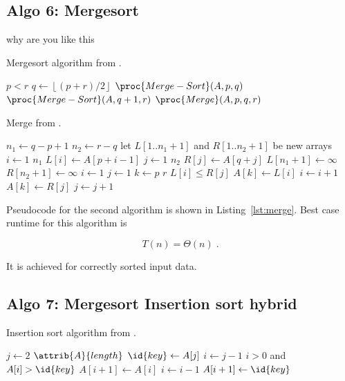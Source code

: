 \subsection{Algo 6: Mergesort}\label{sec:algo6}
why are you like this

\begin{algorithm}[H]
  \caption{Mergesort algorithm from \cite[Ch.~2.1]{cormen_introduction_2009}.}
  \label{lst:mergesort_algo}
  \begin{codebox}
	\li \If $p < r$
	\li \Then $q \gets \left\lfloor(p + r) / 2\right\rfloor$
	\li 	$\proc{Merge-Sort}(A, p, q)$
	\li 	$\proc{Merge-Sort}(A, q+1, r)$
	\li 	$\proc{Merge}(A, p, q, r)$
	\End
  \end{codebox}
\end{algorithm}

\begin{algorithm}[H]
  \caption{Merge from \cite[Ch.~2.1]{cormen_introduction_2009}.}
  \label{lst:merge}
  \begin{codebox}
	\li $n_1 \gets q-p+1$
	\li $n_2 \gets r-q$
	\li let $L[1..n_1+1]$ and $R[1..n_2+1]$ be new arrays
	\li \For $i \gets 1$ \To $n_1$
	\li \Do $L[i] \gets A[p+i-1]$
	\End
	\li \For $j \gets 1$ \To $n_2$
	\li \Do $R[j] \gets A[q+j]$
	\End
	\li $L[n_1+1] \gets \infty$
	\li $R[n_2+1] \gets \infty$
	\li $i \gets 1$
	\li $j \gets 1$
	\li \For $k \gets p$ \To $r$
	\li \Do \If $L[i] \le R[j]$
	\li 	\Then $A[k] \gets L[i]$
	\li 		$i \gets i+1$
	\li 	\Else $A[k] \gets R[j]$
	\li 	$j \gets j+1$
	\End
	\End
  \end{codebox}
\end{algorithm}

Pseudocode for the second algorithm is shown in
Listing~\ref{lst:merge}. Best case runtime for this algorithm
is

\begin{equation}
  T(n) = \Theta(n) \;.  \label{eq:ins_sort_best}
\end{equation}

It is achieved for correctly sorted input data.

\subsection{Algo 7: Mergesort Insertion sort hybrid}\label{sec:algo7}

\begin{algorithm}[H]
  \caption{Insertion sort algorithm from \cite[Ch.~2.1]{cormen_introduction_2009}.}
  \label{lst:mergeinsert_algo}
  \begin{codebox}
    \li \For $j \gets 2$ \To $\attrib{A}{length}$
    \li \Do
    $\id{key} \gets A[j]$
    \li     $i \gets j-1$
    \li      \While $i>0$ and $A[i] > \id{key}$
    \li      \Do
    $A[i+1] \gets A[i]$
    \li         $i \gets i-1$
    \End    
    \li       $A[i+1]\gets \id{key}$
    \End
  \end{codebox}
\end{algorithm}

